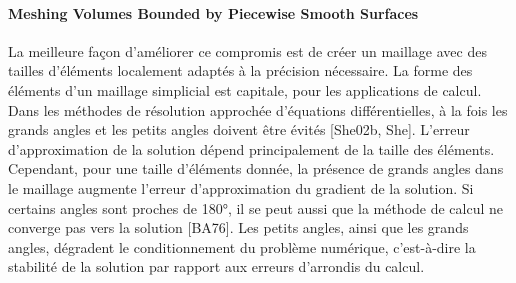 \paragraph{Meshing Volumes Bounded by Piecewise Smooth Surfaces~\cite{LRineau2007}}{

La meilleure façon d'améliorer ce compromis est de créer un maillage avec des tailles d'éléments localement adaptés à la précision nécessaire. La forme des éléments d'un maillage simplicial est capitale, pour les applications de calcul. Dans les méthodes de résolution approchée d'équations différentielles, à la fois les grands angles et les petits angles doivent être évités [She02b, She]. L'erreur d'approximation de la solution dépend principalement de la taille des éléments. Cependant, pour une taille d'éléments donnée, la présence de grands angles dans le maillage augmente l'erreur d'approximation du gradient de la solution. Si certains angles sont proches de 180°, il se peut aussi que la méthode de calcul ne converge pas vers la solution [BA76]. Les petits angles, ainsi que les grands angles, dégradent le conditionnement du problème numérique, c'est-à-dire la stabilité de la solution par rapport aux erreurs d'arrondis du calcul. 


}



